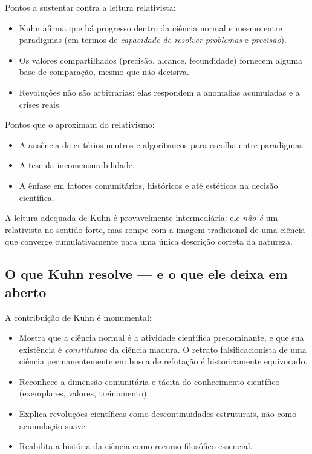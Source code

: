 \documentclass[9pt,a4paper]{extarticle}
\newcommand{\impt}[1]{\textcolor{important}{#1}}
\newcommand{\ntc}[1]{\textcolor{notice}{#1}}
\theoremstyle{definition}
\begin{document}
\ntc{Pontos a sustentar contra a leitura relativista:}
\begin{itemize}
  \item Kuhn afirma que há \impt{progresso} dentro da ciência normal e mesmo entre paradigmas (em termos de \emph{capacidade de resolver problemas} e \emph{precisão}).
  \item Os valores compartilhados (precisão, alcance, fecundidade) fornecem alguma base de comparação, mesmo que não decisiva.
  \item Revoluções não são \impt{arbitrárias}: elas respondem a anomalias acumuladas e a crises reais.
\end{itemize}

\ntc{Pontos que o aproximam do relativismo:}
\begin{itemize}
  \item A ausência de critérios neutros e algorítmicos para escolha entre paradigmas.
  \item A tese da incomensurabilidade.
  \item A ênfase em fatores comunitários, históricos e até estéticos na decisão científica.
\end{itemize}

A leitura adequada de Kuhn é provavelmente intermediária: ele \emph{não é} um relativista no sentido forte, mas rompe com a imagem tradicional de uma ciência que converge cumulativamente para uma única descrição correta da natureza.

\subsection{O que Kuhn resolve --- e o que ele deixa em aberto}

A contribuição de Kuhn é monumental:

\begin{itemize}
  \item Mostra que a \impt{ciência normal} é a atividade científica predominante, e que sua existência é \emph{constitutiva} da ciência madura. O retrato falsificacionista de uma ciência permanentemente em busca de refutação é historicamente equivocado.
  \item Reconhece a dimensão \impt{comunitária e tácita} do conhecimento científico (exemplares, valores, treinamento).
  \item Explica revoluções científicas como \impt{descontinuidades estruturais}, não como acumulação suave.
  \item Reabilita a história da ciência como recurso filosófico essencial.
\end{itemize}
\end{document}

